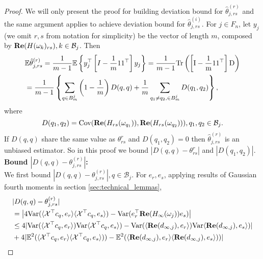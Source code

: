 \begin{proof}
We will only present the proof for building deviation bound for  $\hat{\theta}^{(r)}_{j,rs}$ and the same argument applies to achieve deviation bound for  $\hat{\theta}^{(i)}_{j,rs}$.
For $j\in F_n$, let $y_j$(we omit $r,s$ from notation for simplicity) be the vector of length $m$, composed by  ${\bf Re}(H(\omega_k)_{rs}), k\in \mathcal{B}_j$. Then 
\begin{equation}
\begin{aligned}
&\mathbb{E} \hat{\theta}^{(r)}_{j,rs} = \frac{1}{m-1}\mathbb{E}\left\{y_j^\top   \left[I-\frac{1}{m}11^\top   \right]y_j\right\} = \frac{1}{m-1}\rm{Tr}\left(\left[I-\frac{1}{m}11^\top   \right] D\right) \\
&= \frac{1}{m-1}\left\{\sum_{q\in B^j_m} \left(1-\frac{1}{m}\right)D(q,q) + \frac{1}{m} \sum_{q_1\neq q_2, \in B^j_m}D(q_1,q_2)\right\}, 
\end{aligned}
\end{equation}
where 
\begin{equation}
D(q_1,q_2) = \mbox{Cov}({\bf Re}(H_{rs}(\omega_{q_1})), {\bf Re}(H_{rs}(\omega_{q_2}))), q_1,q_2 \in \mathcal{B}_j.
\end{equation}
If $D(q,q)$ share the same value as $\theta^r_{rs}$ and $D(q_1,q_2)=0$ then $\hat{\theta}^{(r)}_{j,rs}$ is an unbiased estimator. So in this proof we bound  
$|D(q,q) - \theta^r_{rs}|$ and $|D(q_1,q_2)|$.\\[0.2cm]
{\bf Bound $|D(q,q) - \theta^{(r)}_{j, rs}|$:}\\
We first bound  $|D(q,q)-\theta^{(r)}_{j, rs}|, q\in \mathcal{B}_j$. 
For $e_r, e_s$, applying results of Gaussian fourth moments in section \ref{sec:technical_lemmas}, 
\begin{equation}
\label{eq: dif_liminting_var}
\begin{aligned}
&|D(q,q)-\theta^{(r)}_{j, rs}| \\
&=  \left|4\var(\langle \mathcal{X}^\top   c_q,e_r\rangle \langle \mathcal{\mathcal{X}}^\top   c_q,e_s\rangle) - \var(e_r^\top  {\bf Re}(H_{\infty}(\omega_j))e_s)\right| \\
&\le 4|\var(\langle \mathcal{\mathcal{X}}^\top   c_q,e_r\rangle)\var{\langle \mathcal{\mathcal{X}}^\top   c_q,e_s\rangle)} - \var(\langle {\bf Re}(d_{\infty, j}),e_r\rangle)\var{\langle {\bf Re}(d_{\infty, j}),e_s\rangle)}| \\
&+ 4|\mathbb{E}^2(\langle \mathcal{\mathcal{X}}^\top   c_q,e_r\rangle \langle \mathcal{\mathcal{X}}^\top  c_q,e_s\rangle) )-\mathbb{E}^2(\langle {\bf Re}(d_{\infty, j}),e_r\rangle \langle {\bf Re}(d_{\infty, j}),e_s\rangle) )|

\end{aligned}
\end{equation}
\end{proof}
